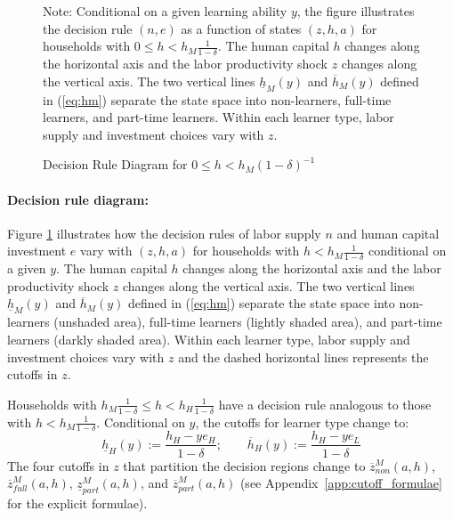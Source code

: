 \documentclass[12pt,english]{article}
\numberwithin{equation}{section}
\begin{document}
\begin{figure}
    \centering
    

\caption{Decision Rule Diagram for $0 \leq h<h_M(1-\delta)^{-1}$}
\begin{flushleft}
\footnotesize{Note: Conditional on a given learning ability $y$, the figure illustrates the decision rule $(n,e)$ as a function of states $(z,h,a)$ for households with $0 \leq h<h_M\frac{1}{1-\delta}$. The human capital $h$ changes along the horizontal axis and the labor productivity shock $z$ changes along the vertical axis. The two vertical lines $\underline{h}_M(y)$ and $\overline{h}_M(y)$ defined in (\ref{eq:hm}) separate the state space into non-learners, full-time learners, and part-time learners. Within each learner type, labor supply and investment choices vary with $z$.} 
\end{flushleft}
    
\label{fig:rule-diagram}
\end{figure}


\paragraph{Decision rule diagram:} Figure \ref{fig:rule-diagram} illustrates how the decision rules of labor supply $n$ and human capital investment $e$ vary with $(z,h,a)$ for households with $h<h_M\frac{1}{1-\delta}$ conditional on a given $y$. The human capital $h$ changes along the horizontal axis and the labor productivity shock $z$ changes along the vertical axis. The two vertical lines $\underline{h}_M(y)$ and $\overline{h}_M(y)$ defined in (\ref{eq:hm}) separate the state space into non-learners (unshaded area), full-time learners (lightly shaded area), and part-time learners (darkly shaded area). Within each learner type, labor supply and investment choices vary with $z$ and the dashed horizontal lines represents the cutoffs in $z$.



\bigskip
\noindent
Households with $h_M\frac{1}{1-\delta} \leq h<h_H\frac{1}{1-\delta}$ have a decision rule analogous to those with $h<h_M\frac{1}{1-\delta}$. Conditional on $y$, the cutoffs for learner type change to:
\begin{equation}\label{eq:hh}
    \underline{h}_H(y):=\frac{h_H-ye_H}{1-\delta}; \qquad \overline{h}_H(y):=\frac{h_H-ye_L}{1-\delta} 
\end{equation}
The four cutoffs in $z$ that partition the decision regions change to $\overline{z}^M_{non}(a,h)$, $\overline{z}^M_{full}(a,h)$, $\underline{z}^M_{part}(a,h)$, and $\overline{z}^M_{part}(a,h)$ (see Appendix~\ref{app:cutoff_formulae} for the explicit formulae).
\end{document}
